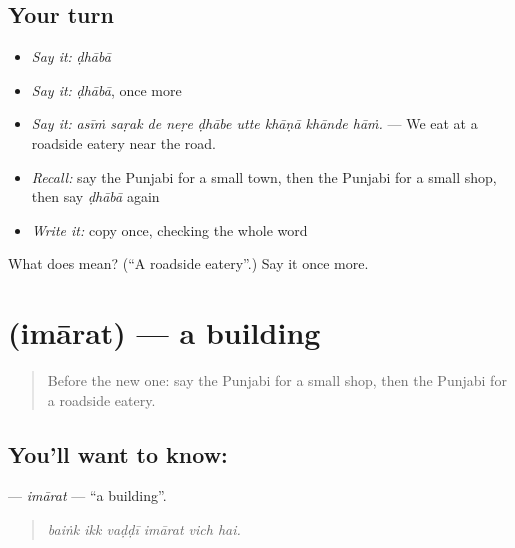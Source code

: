 \subsection*{Your turn}
\begin{itemize}
\raggedright
  \item \emph{Say it:} \emph{ḍhābā}
  \item \emph{Say it:} \emph{ḍhābā}, once more
  \item \emph{Say it:} \emph{asīṁ saṛak de neṛe ḍhābe utte khāṇā khānde hāṁ.} — We eat at a roadside eatery near the road.
  \item \emph{Recall:} say the Punjabi for a small town, then the Punjabi for a small shop, then say \emph{ḍhābā} again
  \item \emph{Write it:} copy \textbf{} once, checking the whole word
\end{itemize}

\begin{tcolorbox}[breakable,colback=teal!4,colframe=teal!35!black,title={Before you move on}]
What does  mean? (\textquotedblleft{}A roadside eatery\textquotedblright{}.) Say it once more.
\end{tcolorbox}
\section[\texorpdfstring{\pa{ਇਮਾਰਤ} (imārat)}{ਇਮਾਰਤ (imārat)}]{ (imārat) — a building}

\label{lesson:PA-C266-imarat}



\begin{quote}
Before the new one: say the Punjabi for a small shop, then the Punjabi for a roadside eatery.
\end{quote}

\subsection*{You'll want to know: }
\textbf{} — \emph{imārat} — \textquotedblleft{}a building\textquotedblright{}.

\begin{quote}
     
\end{quote}

\begin{quote}
\emph{baiṅk ikk vaḍḍī imārat vich hai.}
\end{quote}

